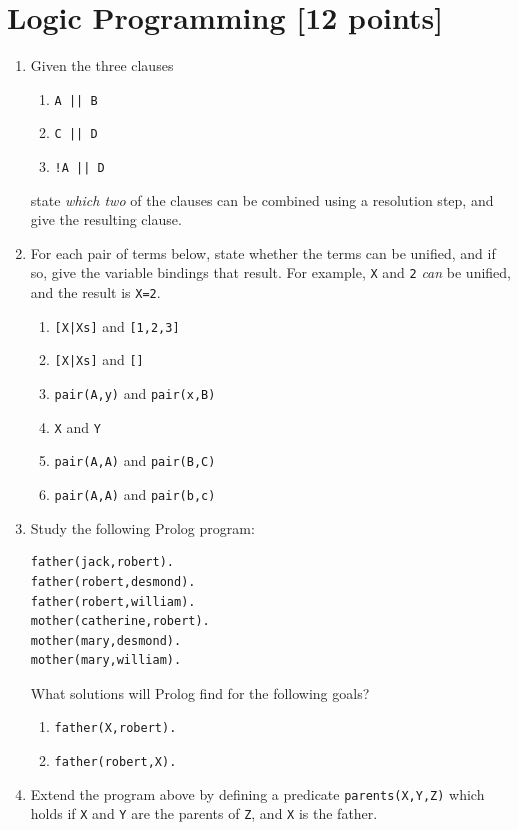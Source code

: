 \documentclass{article}
\begin{document}
\newpage


\section{Logic Programming [12 points]}

\begin{enumerate}
\item
Given the three clauses
\begin{enumerate}
\item \verb!A || B!
\item \verb!C || D!
\item \verb?!A || D?
\end{enumerate}
state {\em which two} of the clauses can be combined using a resolution step, and give the resulting clause.

\item
For each pair of terms below, state whether the terms can be unified,
and if so, give the variable bindings that result. For example,
\verb!X! and \verb!2! {\em can} be unified, and the result is
\verb!X=2!.
\begin{enumerate}
\item \verb![X|Xs]! and \verb![1,2,3]!
\item \verb![X|Xs]! and \verb![]!
\item \verb!pair(A,y)! and \verb!pair(x,B)!
\item \verb!X! and \verb!Y!
\item \verb!pair(A,A)! and \verb!pair(B,C)!
\item \verb!pair(A,A)! and \verb!pair(b,c)!
\end{enumerate}

\item
Study the following Prolog program:
\begin{verbatim}
father(jack,robert).
father(robert,desmond).
father(robert,william).
mother(catherine,robert).
mother(mary,desmond).
mother(mary,william).
\end{verbatim}
What solutions will Prolog find for the following goals?
\begin{enumerate}
\item \verb!father(X,robert).!
\item \verb!father(robert,X).!
\end{enumerate}

\item
Extend the program above by defining a predicate \verb!parents(X,Y,Z)!
which holds if \verb!X! and \verb!Y! are the parents of \verb!Z!, and
\verb!X! is the father.


\end{enumerate}
\end{document}
